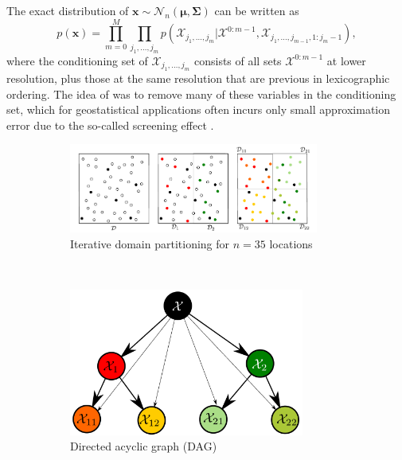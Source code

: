 \documentclass[12pt,letterpaper]{article}
\theoremstyle{propstyle}
\theoremstyle{propstyle}
\theoremstyle{propstyle}
\theoremstyle{propstyle}
\theoremstyle{propstyle}
\newcommand{\bx}{\mathbf{x}}
\newcommand{\bfmu}{\bm{\mu}}
\newcommand{\bfSigma}{\bm{\Sigma}}
\newcommand{\normal}{\mathcal{N}}
\newcommand{\sx}{\mathcal{X}}
\newcommand{\jm}{{j_1,\ldots,j_m}}
\newcommand{\jmm}{{j_1,\ldots,j_{m-1}}}
\begin{document}
The exact distribution of $\bx \sim \normal_n(\bfmu,\bfSigma)$ can be written as
\[
\textstyle p(\bx) = \prod_{m=0}^M \prod_\jm p(\sx_\jm|\sx^{0:m-1}, \sx_{\jmm,1:j_m-1}),
\]
where the conditioning set of $\sx_\jm$ consists of all sets $\sx^{0:m-1}$ at lower resolution, plus those at the same resolution that are previous in lexicographic ordering. The idea of \citet{Vecchia1988} was to remove many of these variables in the conditioning set, which for geostatistical applications often incurs only small approximation error due to the so-called screening effect \citep[e.g.,][]{Stein2002,Stein2011}.


\begin{figure}[!htbp]
    \centering
    \begin{subfigure}{.99\textwidth}
    \centering
    \includegraphics[width=0.9\textwidth]{plots/domain.pdf}
    \caption{Iterative domain partitioning for $n=35$ locations} 
    \label{fig:domain-&-knots}
\end{subfigure}\\
\vspace{3mm}
    \begin{subfigure}{0.54\textwidth}
    \includegraphics[width=0.85\textwidth]{plots/graph.pdf}
    \caption{Directed acyclic graph (DAG)}
    \label{fig:dag}
    \end{subfigure}
    \begin{subfigure}{.44\textwidth}

\end{subfigure}
\end{figure}
\end{document}
